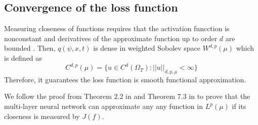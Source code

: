 \documentclass{article}
\begin{document}
\subsection{Convergence of the loss function}

Measuring closeness of functions requires that the activation funcction is nonconstant and derivatives of the approximate function up to order $d$ are bounded \cite{hornik}. 
Then, $q(\psi,x,t)$ is dense in weighted Sobolev space $W^{d,p}(\mu)$ which is defined as \cite{hornik}
\begin{equation}
C^{d,p}(\mu) = \{ u \in C^{d}(\Omega_{T}): ||u||_{d,p,\mu} < \infty \}
\end{equation}
Therefore, it guarantees the loss function is smooth functional approximation.


We follow the proof from Theorem 2.2 in \cite{kurkova} and Theorem 7.3 in \cite{sirignano} to prove that the multi-layer neural network can approximate any any function in $L^{p}(\mu)$ if its closeness is measured by $J(f)$.  
\end{document}
